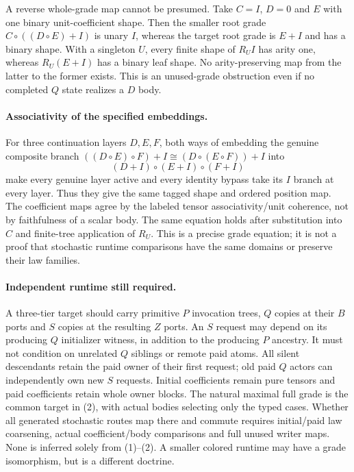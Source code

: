 \documentclass[11pt]{article}\usepackage{amsmath,amssymb,amsthm,geometry}\geometry{margin=1in}
\begin{document}
A reverse whole-grade map cannot be presumed. Take $C=I$, $D=0$ and $E$ with one binary unit-coefficient shape. Then the smaller root grade $C\circ((D\circ E)+I)$ is unary $I$, whereas the target root grade is $E+I$ and has a binary shape. With a singleton $U$, every finite shape of $R_UI$ has arity one, whereas $R_U(E+I)$ has a binary leaf shape. No arity-preserving map from the latter to the former exists. This is an unused-grade obstruction even if no completed $Q$ state realizes a $D$ body.

\paragraph{Associativity of the specified embeddings.}
For three continuation layers $D,E,F$, both ways of embedding the genuine composite branch $((D\circ E)\circ F)+I\cong(D\circ(E\circ F))+I$ into
\[
                  (D+I)\circ(E+I)\circ(F+I)
\]
make every genuine layer active and every identity bypass take its $I$ branch at every layer. Thus they give the same tagged shape and ordered position map. The coefficient maps agree by the labeled tensor associativity/unit coherence, not by faithfulness of a scalar body. The same equation holds after substitution into $C$ and finite-tree application of $R_U$. This is a precise grade equation; it is not a proof that stochastic runtime comparisons have the same domains or preserve their law families.

\paragraph{Independent runtime still required.}
A three-tier target should carry primitive $P$ invocation trees, $Q$ copies at their $B$ ports and $S$ copies at the resulting $Z$ ports. An $S$ request may depend on its producing $Q$ initializer witness, in addition to the producing $P$ ancestry. It must not condition on unrelated $Q$ siblings or remote paid atoms. All silent descendants retain the paid owner of their first request; old paid $Q$ actors can independently own new $S$ requests. Initial coefficients remain pure tensors and paid coefficients retain whole owner blocks. The natural maximal full grade is the common target in (2), with actual bodies selecting only the typed cases. Whether all generated stochastic routes map there and commute requires initial/paid law coarsening, actual coefficient/body comparisons and full unused writer maps. None is inferred solely from (1)--(2). A smaller colored runtime may have a grade isomorphism, but is a different doctrine.
\end{document}
